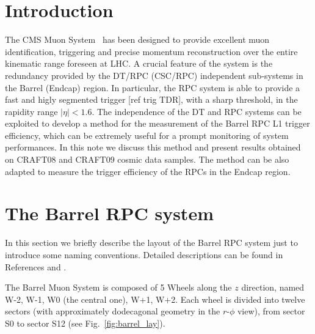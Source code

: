 \maketitle %

\section{Introduction}
The CMS Muon System~\cite{ref:mutdr}\cite{ref:jinst} has 
been designed to provide excellent muon
identification, triggering and precise momentum reconstruction 
over the entire kinematic range foreseen at LHC. A crucial
feature of the system is the redundancy provided by the DT/RPC 
(CSC/RPC) independent sub-systems in the Barrel (Endcap) region.
In particular, the RPC system is able to provide 
a fast and higly segmented trigger [ref trig TDR], with a 
sharp \pt threshold, in the rapidity range $|\eta| < 1.6$.
The independence of the DT and RPC systems can be exploited
to develop a method for the measurement of the Barrel RPC L1 
trigger efficiency, which can be extremely useful 
for a prompt monitoring of system performances.
In this note we discuss this method and present results
obtained on CRAFT08 and CRAFT09 cosmic data samples.
The method can be also adapted to measure the 
trigger efficiency of the RPCs in the Endcap region.

\section{The Barrel RPC system}
In this section we briefly describe the layout of the
Barrel RPC system just to introduce some
naming conventions. Detailed descriptions
can be found in References \cite{ref:mutdr}
and \cite{ref:jinst}.

The Barrel Muon System is composed of 5 Wheels along 
the $z$ direction, named W-2, W-1, W0 (the central one), 
W+1, W+2. Each wheel is divided into twelve 
sectors (with approximately dodecagonal geometry in the 
$r$-$\phi$ view), from sector S0 to sector S12 
(see Fig.~\ref{fig:barrel_lay}).

